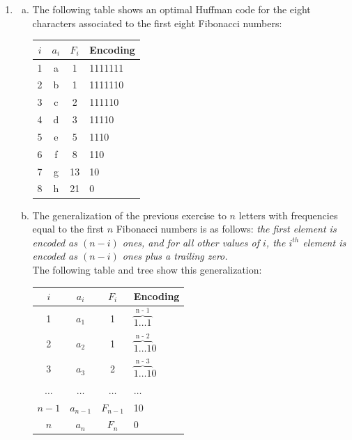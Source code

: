 \documentclass{article}
\begin{document}
\begin{enumerate}[1.]
    \item
    \begin{enumerate}[(a)]
        \item The following table shows an optimal Huffman code for the eight characters associated to the first eight Fibonacci numbers:
    	\begin{table}[ht]
    		\centering
    		\begin{tabular}{cccl}
    			\toprule
    			$i$ & $a_i$ & $F_i$ & Encoding \\
    			\midrule
                1 & a & 1 & 1111111 \\
                2 & b & 1 & 1111110 \\
                3 & c & 2 & 111110 \\
                4 & d & 3 & 11110 \\
                5 & e & 5 & 1110 \\
                6 & f & 8 & 110 \\
                7 & g & 13 & 10 \\
                8 & h & 21 & 0 \\
    			\bottomrule
    		\end{tabular}
	    \end{table}
    	
    	\item The generalization of the previous exercise to $n$ letters with frequencies equal to the first $n$ Fibonacci numbers is as follows: \emph{the first element is encoded as $(n-i)$ ones, and for all other values of $i$, the $i^{th}$ element is encoded as $(n-i)$ ones plus a trailing zero.}\\
    	The following table and tree show this generalization:
    	\begin{table}[ht]
    		\centering
    		\begin{tabular}{cccl}
    			\toprule
    			$i$ & $a_i$ & $F_i$ & Encoding \\
    			\midrule
                1 & $a_1$ & 1 & $\overbrace{1 \ldots 1}^\text{n - 1}$ \\
                2 & $a_2$ & 1 & $\overbrace{1 \ldots 1}^\text{n - 2}0$ \\
                3 & $a_3$ & 2 & $\overbrace{1 \ldots 1}^\text{n - 3}0$ \\
                $\ldots$ & $\ldots$ & $\ldots$ & $\ldots$ \\
                $n-1$ & $a_{n-1}$ & $F_{n-1}$ & 10 \\
                $n$ & $a_n$ & $F_n$ & 0 \\
    			\bottomrule
    		\end{tabular}
	    \end{table}


\end{enumerate}
\end{enumerate}
\end{document}
